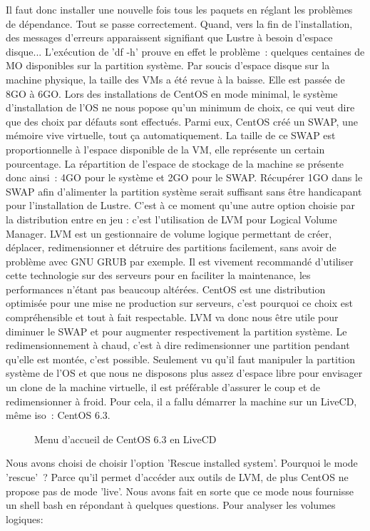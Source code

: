 \documentclass[12pt]{article}
\begin{document}
Il faut donc installer une nouvelle fois tous les paquets en réglant les problèmes de dépendance. Tout se passe correctement. Quand, vers la fin de l'installation, des messages d'erreurs apparaissent signifiant que Lustre à besoin d'espace disque... L’exécution de 'df -h' prouve en effet le problème : quelques centaines de MO disponibles sur la partition système. Par soucis d'espace disque sur la machine physique, la taille des VMs a été revue à la baisse. Elle est passée de 8GO à 6GO. Lors des installations de CentOS en mode minimal, le système d'installation de l'OS ne nous popose qu'un minimum de choix, ce qui veut dire que des choix par défauts sont effectués. Parmi eux, CentOS créé un SWAP, une mémoire vive virtuelle, tout ça automatiquement. La taille de ce SWAP est proportionnelle à l'espace disponible de la VM, elle représente un certain pourcentage. La répartition de l'espace de stockage de la machine se présente donc ainsi : 4GO pour le système et 2GO pour le SWAP. Récupérer 1GO dans le SWAP afin d'alimenter la partition système serait suffisant sans être handicapant pour l'installation de Lustre. C'est à ce moment qu'une autre option choisie par la distribution entre en jeu : c'est l'utilisation de LVM pour Logical Volume Manager. LVM est un gestionnaire de volume logique permettant de créer, déplacer, redimensionner et détruire des partitions facilement, sans avoir de problème avec GNU GRUB par exemple. Il est vivement recommandé d'utiliser cette technologie sur des serveurs pour en faciliter la maintenance, les performances n'étant pas beaucoup altérées. CentOS est une distribution optimisée pour une mise ne production sur serveurs, c'est pourquoi ce choix est compréhensible et tout à fait respectable. LVM va donc nous être utile pour diminuer le SWAP et pour augmenter respectivement la partition système. Le redimensionnement à chaud, c'est à dire redimensionner une partition pendant qu'elle est montée, c'est possible. Seulement vu qu'il faut manipuler la partition système de l'OS et que nous ne disposons plus assez d'espace libre pour envisager un clone de la machine virtuelle, il est préférable d'assurer le coup et de redimensionner à froid. Pour cela, il a fallu démarrer la machine sur un LiveCD, même iso : CentOS 6.3.

\begin{figure}[H]
\caption{Menu d'accueil de CentOS 6.3 en LiveCD}
\label{fig:identification}
\end{figure}

Nous avons choisi de choisir l'option 'Rescue installed system'. Pourquoi le mode 'rescue' ? Parce qu'il permet d'accéder aux outils de LVM, de plus CentOS ne propose pas de mode 'live'. Nous avons fait en sorte que ce mode nous fournisse un shell bash en répondant à quelques questions. Pour analyser les volumes logiques:
\end{document}
